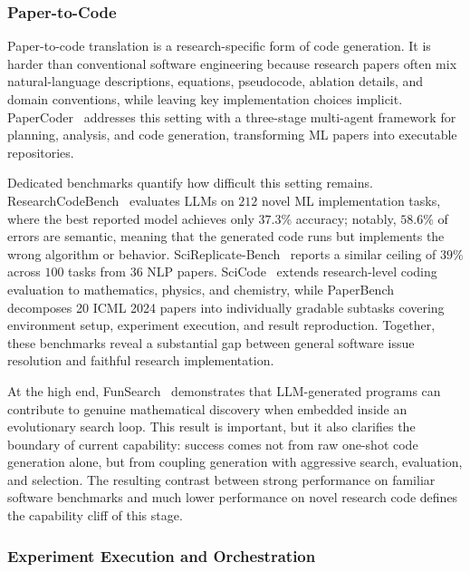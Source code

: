 \documentclass{llmxive}
\begin{document}
\subsubsection{Paper-to-Code}
\label{sec:paper2code}

Paper-to-code translation is a research-specific form of code generation. It is harder than conventional software engineering because research papers often mix natural-language descriptions, equations, pseudocode, ablation details, and domain conventions, while leaving key implementation choices implicit. PaperCoder~\cite{papercoder2025} addresses this setting with a three-stage multi-agent framework for planning, analysis, and code generation, transforming ML papers into executable repositories.

Dedicated benchmarks quantify how difficult this setting remains. ResearchCodeBench~\cite{researchcodebench2025} evaluates LLMs on $212$ novel ML implementation tasks, where the best reported model achieves only $37.3\%$ accuracy; notably, $58.6\%$ of errors are semantic, meaning that the generated code runs but implements the wrong algorithm or behavior. SciReplicate-Bench~\cite{scireplicatebench2025} reports a similar ceiling of $39\%$ across $100$ tasks from $36$ NLP papers. SciCode~\cite{scicode2024} extends research-level coding evaluation to mathematics, physics, and chemistry, while PaperBench~\cite{paperbench2025} decomposes 20 ICML 2024 papers into individually gradable subtasks covering environment setup, experiment execution, and result reproduction. Together, these benchmarks reveal a substantial gap between general software issue resolution and faithful research implementation.

At the high end, FunSearch~\cite{funsearch2024} demonstrates that LLM-generated programs can contribute to genuine mathematical discovery when embedded inside an evolutionary search loop. This result is important, but it also clarifies the boundary of current capability: success comes not from raw one-shot code generation alone, but from coupling generation with aggressive search, evaluation, and selection. The resulting contrast between strong performance on familiar software benchmarks and much lower performance on novel research code defines the capability cliff of this stage.



\subsubsection{Experiment Execution and Orchestration}
\label{sec:exp_execution}
\end{document}
